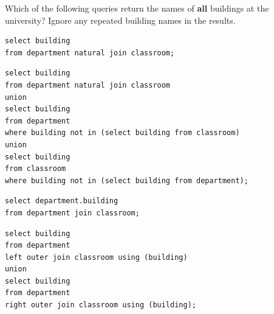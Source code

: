 \documentclass[12pt]{exam}
\begin{document}
\begin{questions}
\begin{minipage}{\linewidth}
\question[8]
Which of the following queries return the names of \textbf{all} buildings at the university? 
Ignore any repeated building names in the results.\par\vspace{0.5em}

\begin{checkboxes}
\choice
\begin{verbatim}
select building
from department natural join classroom;
\end{verbatim}

\CorrectChoice
\begin{verbatim}
select building
from department natural join classroom
union
select building
from department
where building not in (select building from classroom)
union
select building
from classroom
where building not in (select building from department);
\end{verbatim}

\choice
\begin{verbatim}
select department.building
from department join classroom;
\end{verbatim}

\CorrectChoice
\begin{verbatim}
select building
from department
left outer join classroom using (building)
union
select building
from department
right outer join classroom using (building);
\end{verbatim}

\end{checkboxes}
\end{minipage}\vspace{1em}


\end{questions}
\end{document}
